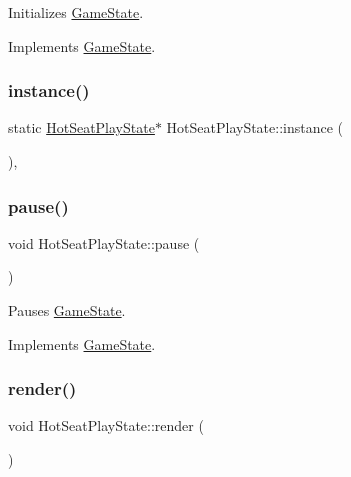 Initializes \mbox{\hyperlink{class_game_state}{Game\+State}}. 



Implements \mbox{\hyperlink{class_game_state_a10b6e6bb31591c70d08ffcee5f29fa81}{Game\+State}}.

\mbox{\label{class_hot_seat_play_state_a2a0510cffde2533a6b8c9e02fa299302}} 
\subsubsection{\texorpdfstring{instance()}{instance()}}
{\footnotesize\ttfamily static \mbox{\hyperlink{class_hot_seat_play_state}{Hot\+Seat\+Play\+State}}$\ast$ Hot\+Seat\+Play\+State\+::instance (\begin{DoxyParamCaption}{ }\end{DoxyParamCaption})\hspace{0.3cm}{\ttfamily [inline]}, {\ttfamily [static]}}

\mbox{\label{class_hot_seat_play_state_af0e96c626d63f71e714bbf8119308751}} 
\subsubsection{\texorpdfstring{pause()}{pause()}}
{\footnotesize\ttfamily void Hot\+Seat\+Play\+State\+::pause (\begin{DoxyParamCaption}{ }\end{DoxyParamCaption})\hspace{0.3cm}{\ttfamily [virtual]}}



Pauses \mbox{\hyperlink{class_game_state}{Game\+State}}. 



Implements \mbox{\hyperlink{class_game_state_aafc908582760099891b37bb380ddd87a}{Game\+State}}.

\mbox{\label{class_hot_seat_play_state_a66bbc19d0a2046a3ff2d926669d0ae26}} 
\subsubsection{\texorpdfstring{render()}{render()}}
{\footnotesize\ttfamily void Hot\+Seat\+Play\+State\+::render (\begin{DoxyParamCaption}\item[{\mbox{\hyperlink{class_game_engine}{Game\+Engine}} $\ast$}]{ }\end{DoxyParamCaption})\hspace{0.3cm}{\ttfamily [virtual]}}



